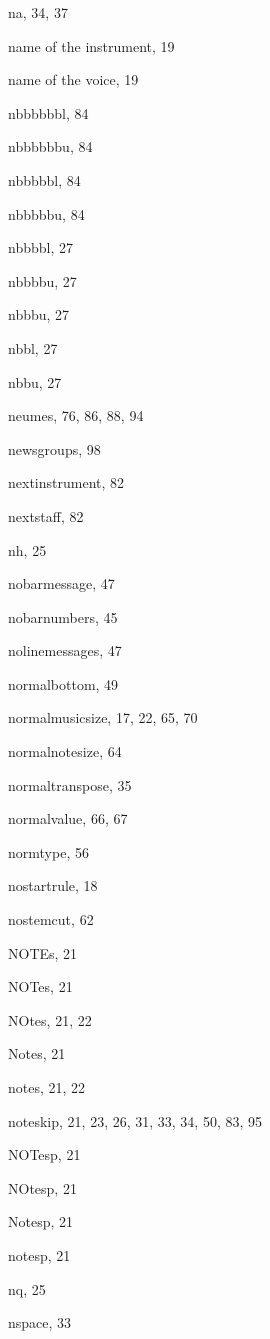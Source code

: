 \begin{theindex}
  \item {\Bslash na}, 34, 37
  \item name of the instrument, 19
  \item name of the voice, 19
  \item {\Bslash nbbbbbbl}, 84
  \item {\Bslash nbbbbbbu}, 84
  \item {\Bslash nbbbbbl}, 84
  \item {\Bslash nbbbbbu}, 84
  \item {\Bslash nbbbbl}, 27
  \item {\Bslash nbbbbu}, 27
  \item {\Bslash nbbbu}, 27
  \item {\Bslash nbbl}, 27
  \item {\Bslash nbbu}, 27
  \item neumes, 76, 86, 88, 94
  \item newsgroups, 98
  \item {\Bslash nextinstrument}, 82
  \item {\Bslash nextstaff}, 82
  \item {\Bslash nh}, 25
  \item {\Bslash nobarmessage}, 47
  \item {\Bslash nobarnumbers}, 45
  \item {\Bslash nolinemessages}, 47
  \item {\Bslash normalbottom}, 49
  \item {\Bslash normalmusicsize}, 17, 22, 65, 70
  \item {\Bslash normalnotesize}, 64
  \item {\Bslash normaltranspose}, 35
  \item {\Bslash normalvalue}, 66, 67
  \item {\Bslash normtype}, 56
  \item {\Bslash nostartrule}, 18
  \item {\Bslash nostemcut}, 62
  \item {\Bslash NOTEs}, 21
  \item {\Bslash NOTes}, 21
  \item {\Bslash NOtes}, 21, 22
  \item {\Bslash Notes}, 21
  \item {\Bslash notes}, 21, 22
  \item {\Bslash noteskip}, 21, 23, 26, 31, 33, 34, 50, 83, 95
  \item {\Bslash NOTesp}, 21
  \item {\Bslash NOtesp}, 21
  \item {\Bslash Notesp}, 21
  \item {\Bslash notesp}, 21
  \item {\Bslash nq}, 25
  \item {\Bslash nspace}, 33


\end{theindex}
